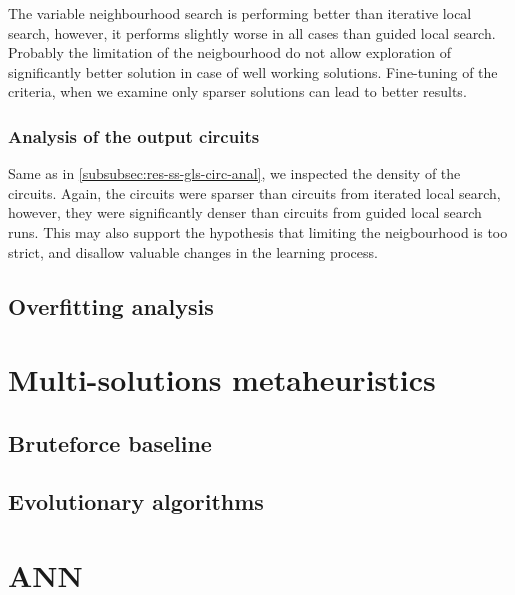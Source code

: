 \documentclass[
  print, %
  Table,   %
  nolof,     %
  nolot,     %
  11pt, %
  oneside  %
]{fithesis3}
\begin{document}
The variable neighbourhood search is performing better than iterative local search, however, it performs slightly worse in all cases than guided local search. Probably the limitation of the neigbourhood do not allow exploration of significantly better solution in case of well working solutions. Fine-tuning of the criteria, when we examine only sparser solutions can lead to better results.

\subsubsection{Analysis of the output circuits}
\label{subsubsec:res-ss-vns-circ-anal}

Same as in \cref{subsubsec:res-ss-gls-circ-anal}, we inspected the density of the circuits. Again, the circuits were sparser than circuits from iterated local search, however, they were significantly denser than circuits from guided local search runs. This may also support the hypothesis that limiting the neigbourhood is too strict, and disallow valuable changes in the learning process.

\subsection{Overfitting analysis}
\label{subsec:res-ss-overfitting}

\section{Multi-solutions metaheuristics}
\label{sec:res-ms}
\subsection{Bruteforce baseline}
\label{subsec:res-ms-bruteforce}
\subsection{Evolutionary algorithms}
\label{subsec:res-ms-aco}

\section{ANN}
\label{sec:res-ann}

\end{document}
